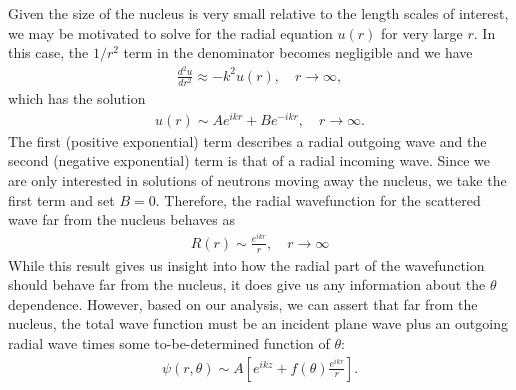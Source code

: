Given the size of the nucleus is very small relative to the length scales of interest, we may be motivated to solve for the radial equation $u(r)$ for very large $r$. In this case, the $1/r^2$ term in the denominator becomes negligible and we have
\begin{align}
  \frac{d^2u}{dr^2} \approx -k^2 u(r), \quad r \rightarrow \infty,
\end{align}
which has the solution
\begin{align}
  u(r) \sim A e^{ikr} + B e^{-ikr} , \quad r \rightarrow \infty.
\end{align}
The first (positive exponential) term describes a radial outgoing wave and the second (negative exponential) term is that of a radial incoming wave. Since we are only interested in solutions of neutrons moving away the nucleus, we take the first term and set $B = 0$. Therefore, the radial wavefunction for the scattered wave far from the nucleus behaves as
\begin{align}
  R(r) \sim \frac{ e^{ikr} }{ r }, \quad r \rightarrow \infty
\end{align}
While this result gives us insight into how the radial part of the wavefunction should behave far from the nucleus, it does give us any information about the $\theta$ dependence. However, based on our analysis, we can assert that far from the nucleus, the total wave function must be an incident plane wave plus an outgoing radial wave times some to-be-determined function of $\theta$:
\begin{align} \label{Eq:nuclearData_wavefunctionAsymptoticForm}
  \psi(r,\theta) \sim A \left[ e^{ikz} + f(\theta) \frac{ e^{ikr} }{ r } \right] .
\end{align}

%

